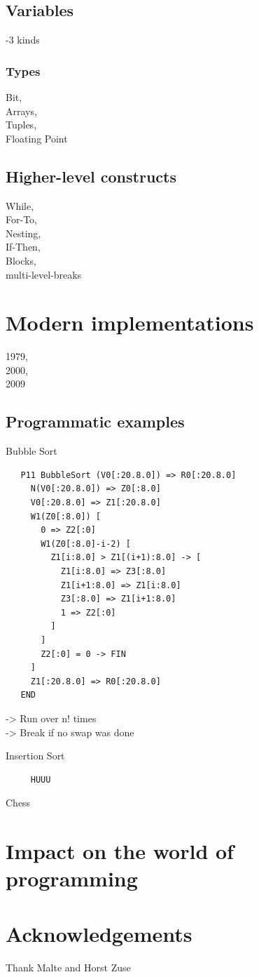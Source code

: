 \documentclass{llncs}
\begin{document}
 \subsection{Variables}
   -3 kinds
 \subsubsection{Types}
   Bit, \\Arrays, \\Tuples, \\Floating Point
 \subsection{Higher-level constructs}
   While, \\For-To, \\Nesting, \\If-Then, \\Blocks,
   \\multi-level-breaks
 \section{Modern implementations}
   1979, \\2000, \\2009
 \subsection{Programmatic examples}
   Bubble Sort\\
   \begin{lstlisting}
   P11 BubbleSort (V0[:20.8.0]) => R0[:20.8.0]
     N(V0[:20.8.0]) => Z0[:8.0]
     V0[:20.8.0] => Z1[:20.8.0]
     W1(Z0[:8.0]) [
       0 => Z2[:0]
       W1(Z0[:8.0]-i-2) [
         Z1[i:8.0] > Z1[(i+1):8.0] -> [
           Z1[i:8.0] => Z3[:8.0]
           Z1[i+1:8.0] => Z1[i:8.0]
           Z3[:8.0] => Z1[i+1:8.0]
           1 => Z2[:0]
         ]
       ]
       Z2[:0] = 0 -> FIN
     ]
     Z1[:20.8.0] => R0[:20.8.0]
   END
   \end{lstlisting}
     -> Run over n! times\\
     -> Break if no swap was done
     
   Insertion Sort
   \begin{verbatim}
     HUUU
   \end{verbatim}
   Chess

 
   \section{Impact on the world of programming}
   \section*{Acknowledgements}
   Thank Malte and Horst Zuse
  
  
  \clearpage
\end{document}
